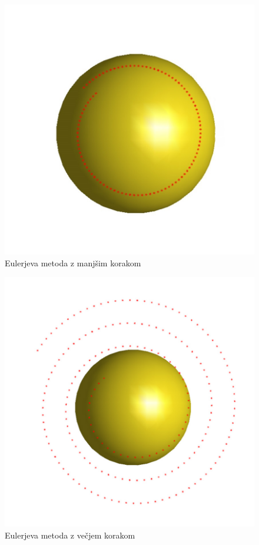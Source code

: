 \documentclass[12pt]{article}
\begin{document}
	\begin{figure}[H]
		\centering
		\includegraphics[scale=0.30]{eul1}
		\caption{Eulerjeva metoda z manjšim korakom}
		\label{slika:eul1}
	\end{figure}
	\begin{figure}[H]
		\centering
		\includegraphics[scale=0.30]{eul2}
		\caption{Eulerjeva metoda z večjem korakom}
		\label{slika:eul2}
	\end{figure}
	
\end{document}

